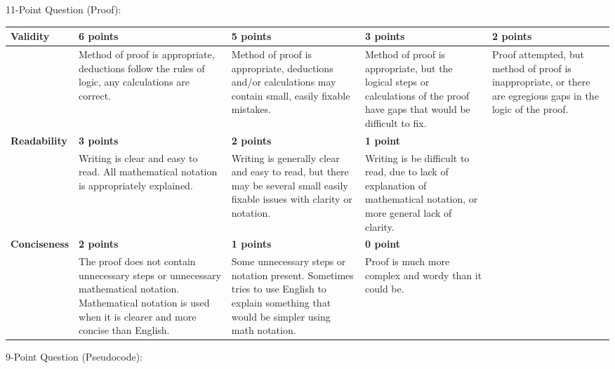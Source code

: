 \documentclass[12pt,landscape]{article}
\begin{document}
\newpage

{\large 11-Point Question (Proof):}


{\renewcommand{\arraystretch}{2}
\begin{tabular}{|p{2.3cm}|p{4.2cm}|p{4.2cm}|p{4.2cm}|p{4.2cm}|}
\hline
{\bf Validity } & {\bf 6 points} & {\bf 5 points} & {\bf 3 points} & {\bf 2 points} \\
\hline
& 
Method of proof is appropriate, deductions follow the rules of logic, any calculations are correct. & 
Method of proof is appropriate, deductions and/or calculations may contain small, easily fixable mistakes. & 
Method of proof is appropriate, but the logical steps or calculations of the proof have gaps that would be difficult to fix. & 
Proof attempted, but method of proof is inappropriate, or there are egregious gaps in the logic of the proof.\\
\hline
{\bf Readability } & {\bf 3 points} & {\bf 2 points} & {\bf 1 point} & \\
\hline
& 
 Writing is clear and easy to read. All mathematical notation is appropriately explained.& 
 Writing is generally clear and easy to read, but there may be several small easily fixable issues with clarity or notation.& 
 Writing is be difficult to read, due to lack of explanation of mathematical notation, or more general lack of clarity.& \\
\hline
{\bf Conciseness} &  {\bf 2 points} & {\bf 1 points} & {\bf 0 point} &\\
\hline
 

&
The proof does not contain unnecessary steps or unnecessary mathematical notation. Mathematical notation is used when it is clearer and more concise than English.
&
Some unnecessary steps or notation present. Sometimes tries to use English to explain something that would be simpler using math notation.
&
Proof is much more complex and wordy than it could be.&\\
\hline
 \end{tabular}
}




\newpage

{\large 9-Point Question (Pseudocode):}
\end{document}
